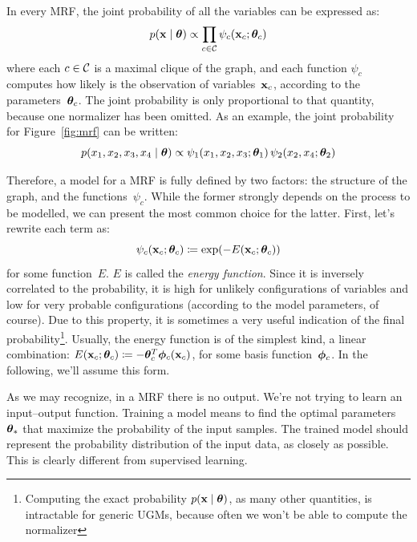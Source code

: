 In every MRF, the joint probability of all the variables can be expressed as:
\begin{equation}
	p(\mathbf{x} \mid \bm{\theta}) \propto
		\prod_{c \in \mathcal{C}} \psi_c(\mathbf{x}_c; \bm{\theta}_c)
\end{equation}
where each $c \in \mathcal{C}$ is a maximal clique of the graph, and each
function $\psi_c$ computes how likely is the observation of variables~$\mathbf{x}_c$,
according to the parameters~$\bm{\theta}_c$. The joint probability is only
proportional to that quantity, because one normalizer has been omitted. As an
example, the joint probability for Figure~\ref{fig:mrf} can be written:
\[
	p(x_1, x_2, x_3, x_4 \mid \bm{\theta}) \propto
	\psi_1(x_1, x_2, x_3; \bm{\theta}_1) \, \psi_2(x_2, x_4; \bm{\theta}_2)
\]

Therefore, a model for a MRF is fully defined by two factors: the structure of
the graph, and the functions~$\psi_c$. While the former strongly depends on
the process to be modelled, we can present the most common choice for the
latter. First, let's rewrite each term as:
\begin{equation}
	\psi_c(\mathbf{x}_c; \bm{\theta}_c) \coloneqq \exp(-E(\mathbf{x}_c; \bm{\theta}_c))
	\label{eq:ugm-energy-based}
\end{equation}
for some function~$E$. $E$ is called the \emph{energy function}. Since it is
inversely correlated to the probability, it is high for unlikely
configurations of variables and low for very probable configurations
(according to the model parameters, of course). Due to this property, it is
sometimes a very useful indication of the final probability\footnote{Computing
the exact probability $p(\mathbf{x} \mid \bm{\theta})$, as many other quantities, is
intractable for generic UGMs, because often we won't be able to compute the
normalizer}.  Usually, the energy function is of the simplest kind, a linear
combination: $E(\mathbf{x}_c; \bm{\theta}_c) \coloneqq -\bm{\theta}_c^T \bm{\phi}_c(\mathbf{x}_c)$,
for some basis function~$\bm{\phi}_c$. In the following, we'll assume this
form.

As we may recognize, in a MRF there is no output. We're not trying to learn an
input--output function. Training a model means to find the optimal parameters
${\bm{\theta}}_*$ that maximize the probability of the input samples. The
trained model should represent the probability distribution of the input data,
as closely as possible. This is clearly different from supervised learning.

